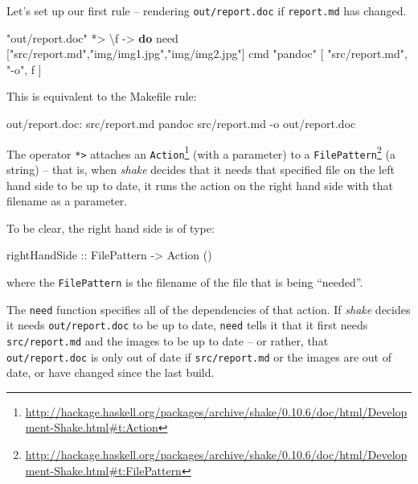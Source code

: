 \documentclass[]{article}
\newenvironment{Shaded}{}{}
\newcommand{\DataTypeTok}[1]{\textcolor[rgb]{0.56,0.13,0.00}{#1}}
\newcommand{\DecValTok}[1]{\textcolor[rgb]{0.25,0.63,0.44}{#1}}
\newcommand{\FunctionTok}[1]{\textcolor[rgb]{0.02,0.16,0.49}{#1}}
\newcommand{\KeywordTok}[1]{\textcolor[rgb]{0.00,0.44,0.13}{\textbf{#1}}}
\newcommand{\NormalTok}[1]{#1}
\newcommand{\OtherTok}[1]{\textcolor[rgb]{0.00,0.44,0.13}{#1}}
\newcommand{\StringTok}[1]{\textcolor[rgb]{0.25,0.44,0.63}{#1}}
\renewcommand{\href}[2]{#2\footnote{\url{#1}}}
\begin{document}
Let's set up our first rule -- rendering \texttt{out/report.doc} if
\texttt{report.md} has changed.

\begin{Shaded}
\begin{Highlighting}[]
\StringTok{"out/report.doc"} \FunctionTok{*>}\NormalTok{ \textbackslash{}f }\OtherTok{->} \KeywordTok{do}
\NormalTok{    need [}\StringTok{"src/report.md"}\NormalTok{,}\StringTok{"img/img1.jpg"}\NormalTok{,}\StringTok{"img/img2.jpg"}\NormalTok{]}
\NormalTok{    cmd }\StringTok{"pandoc"}\NormalTok{ [ }\StringTok{"src/report.md"}\NormalTok{, }\StringTok{"-o"}\NormalTok{, f ]}
\end{Highlighting}
\end{Shaded}

This is equivalent to the Makefile rule:

\begin{Shaded}
\begin{Highlighting}[]
\DecValTok{out/report.doc:}\DataTypeTok{ src/report.md}
\NormalTok{	pandoc src/report.md -o out/report.doc}
\end{Highlighting}
\end{Shaded}

The operator \texttt{*\textgreater{}} attaches an
\href{http://hackage.haskell.org/packages/archive/shake/0.10.6/doc/html/Development-Shake.html\#t:Action}{\texttt{Action}}
(with a parameter) to a
\href{http://hackage.haskell.org/packages/archive/shake/0.10.6/doc/html/Development-Shake.html\#t:FilePattern}{\texttt{FilePattern}}
(a string) -- that is, when \emph{shake} decides that it needs that specified
file on the left hand side to be up to date, it runs the action on the right
hand side with that filename as a parameter.

To be clear, the right hand side is of type:

\begin{Shaded}
\begin{Highlighting}[]
\OtherTok{rightHandSide ::} \DataTypeTok{FilePattern} \OtherTok{->} \DataTypeTok{Action}\NormalTok{ ()}
\end{Highlighting}
\end{Shaded}

where the \texttt{FilePattern} is the filename of the file that is being
``needed''.

The \texttt{need} function specifies all of the dependencies of that action. If
\emph{shake} decides it needs \texttt{out/report.doc} to be up to date,
\texttt{need} tells it that it first needs \texttt{src/report.md} and the images
to be up to date -- or rather, that \texttt{out/report.doc} is only out of date
if \texttt{src/report.md} or the images are out of date, or have changed since
the last build.
\end{document}
